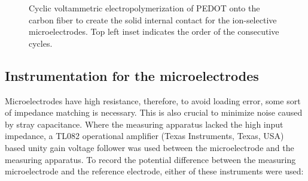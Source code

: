 \begin{figure}
\centering
{}
\caption[Cyclic voltammetric electropolymerization of PEDOT onto the carbon fiber to create the solid internal contact for the ion-selective microelectrodes.]{Cyclic voltammetric electropolymerization of PEDOT onto the carbon fiber to create the solid internal contact for the ion-selective microelectrodes.
Top left inset indicates the order of the consecutive cycles.}
\label{fig:polymerization}
\end{figure}

\subsection{Instrumentation for the microelectrodes}
Microelectrodes have high resistance, therefore, to avoid loading error, some sort of impedance matching is necessary.
This is also crucial to minimize noise caused by stray capacitance.
Where the measuring apparatus lacked the high input impedance, a TL082 operational amplifier (Texas Instruments, Texas, USA) based unity gain voltage follower was used between the microelectrode and the measuring apparatus.
To record the potential difference between the measuring microelectrode and the reference electrode, either of these instruments were used:

